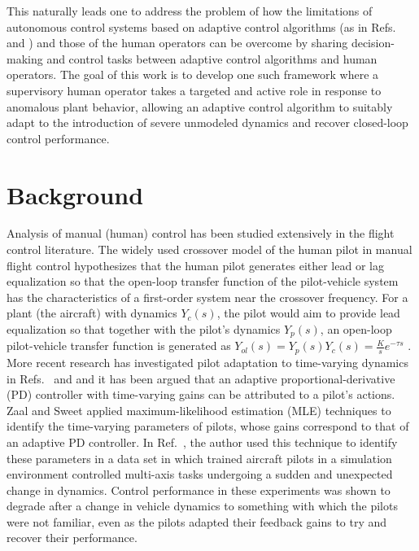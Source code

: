 This naturally leads one to address the problem of how the limitations of autonomous control systems based on adaptive control algorithms (as in Refs.~\cite{narendra2012stable} and \cite{lavretsky2013robust}) and those of the human operators can be overcome by sharing decision-making and control tasks between adaptive control algorithms and human operators. The goal of this work is to develop one such framework where a supervisory human operator takes a targeted and active role in response to anomalous plant behavior, allowing an adaptive control algorithm to suitably adapt to the introduction of severe unmodeled dynamics and recover closed-loop control performance.  

\section{Background}
Analysis of manual (human) control \cite{hess2015modeling, zaal2016manual, mcruer1967review, mcruer1980human} has been studied extensively in the flight control literature. The widely used crossover model of the human pilot in manual flight control\cite{mcruer1967review} hypothesizes that the human pilot generates either lead or lag equalization so that the open-loop transfer function of the pilot-vehicle system has the characteristics of a first-order system near the crossover frequency. For a plant (the aircraft) with dynamics $Y_c(s)$, the pilot would aim to provide lead equalization so that together with the pilot's dynamics $Y_p(s)$, an open-loop pilot-vehicle transfer function is generated as $Y_{ol}(s)  = Y_p(s)Y_c(s) = \frac{K}{s} e^{-\tau s}$ \cite{mcruer1980human}. More recent research has investigated pilot adaptation to time-varying dynamics in Refs.~\cite{hess2015modeling} and \cite{hess2009modeling} and it has been argued that an adaptive proportional-derivative (PD) controller with time-varying gains can be attributed to a pilot's actions. Zaal and Sweet \cite{zaal2011estimation} applied maximum-likelihood estimation (MLE) techniques to identify the time-varying parameters of pilots, whose gains correspond to that of an adaptive PD controller. In  Ref.~\cite{zaal2016manual}, the author used this technique to identify these parameters in a data set in which trained aircraft pilots in a simulation environment controlled multi-axis tasks undergoing a sudden and unexpected change in dynamics. Control performance in these experiments was shown to degrade after a change in vehicle dynamics to something with which the pilots were not familiar, even as the pilots adapted their feedback gains to try and recover their performance.

